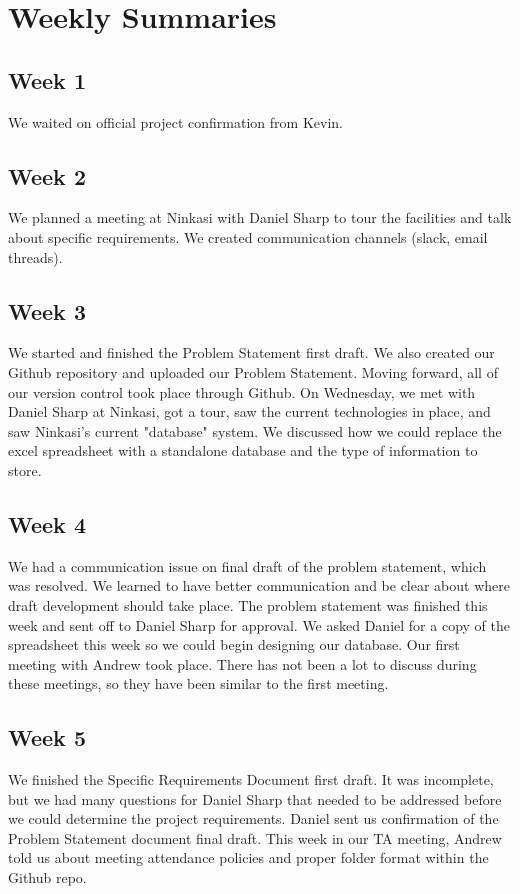 \documentclass[draftclsnofoot,onecolumn,letterpaper,10pt,compsoc]{IEEEtran}
\begin{document}
\section{Weekly Summaries}
\subsection{Week 1}
We waited on official project confirmation from Kevin.

\subsection{Week 2}
We planned a meeting at Ninkasi with Daniel Sharp to tour the facilities and talk about specific requirements.
We created communication channels (slack, email threads).

\subsection{Week 3}
We started and finished the Problem Statement first draft.
We also created our Github repository and uploaded our Problem Statement.
Moving forward, all of our version control took place through Github.
On Wednesday, we met with Daniel Sharp at Ninkasi, got a tour, saw the current technologies in place, and saw Ninkasi's current "database" system.
We discussed how we could replace the excel spreadsheet with a standalone database and the type of information to store.

\subsection{Week 4}
We had a communication issue on final draft of the problem statement, which was resolved.
We learned to have better communication and be clear about where draft development should take place.
The problem statement was finished this week and sent off to Daniel Sharp for approval.
We asked Daniel for a copy of the spreadsheet this week so we could begin designing our database.
Our first meeting with Andrew took place.
There has not been a lot to discuss during these meetings, so they have been similar to the first meeting.

\subsection{Week 5}
We finished the Specific Requirements Document first draft.
It was incomplete, but we had many questions for Daniel Sharp that needed to be addressed before we could determine the project requirements.
Daniel sent us confirmation of the Problem Statement document final draft.
This week in our TA meeting, Andrew told us about meeting attendance policies and proper folder format within the Github repo.
\end{document}
